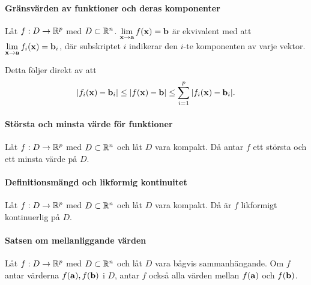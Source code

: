 \paragraph{Gränsvärden av funktioner och deras komponenter}
Låt $f: D\to\mathbb{R}^p$ med $D\subset\mathbb{R}^n$. $\limit{\vect{x}}{\vect{a}}f(\vect{x}) = \vect{b}$ är ekvivalent med att $\limit{\vect{x}}{\vect{a}}f_i(\vect{x}) = \vect{b}_i$, där subskriptet $i$ indikerar den $i$-te komponenten av varje vektor.

\proof
Detta följer direkt av att
\begin{align*}
	\abs{f_i(\vect{x}) - \vect{b}_i}\leq\abs{f(\vect{x}) - \vect{b}}\leq\sum\limits_{i = 1}^{p}\abs{f_i(\vect{x}) - \vect{b}_i}.
\end{align*}

\paragraph{Största och minsta värde för funktioner}
Låt $f: D\to\mathbb{R}^p$ med $D\subset\mathbb{R}^n$ och låt $D$ vara kompakt. Då antar $f$ ett största och ett minsta värde på $D$.

\proof

\paragraph{Definitionsmängd och likformig kontinuitet}
Låt $f: D\to\mathbb{R}^p$ med $D\subset\mathbb{R}^n$ och låt $D$ vara kompakt. Då är $f$ likformigt kontinuerlig på $D$.

\proof

\paragraph{Satsen om mellanliggande värden}
Låt $f: D\to\mathbb{R}^p$ med $D\subset\mathbb{R}^n$ och låt $D$ vara bågvis sammanhängande. Om $f$ antar värderna $f(\vect{a}), f(\vect{b})$ i $D$, antar $f$ också alla värden mellan $f(\vect{a})$ och $f(\vect{b})$.

\proof